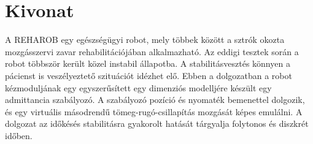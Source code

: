 \cleardoublepage{}
\chapter*{Kivonat}

A REHAROB egy egészségügyi robot, mely többek között a sztrók okozta mozgásszervi 
zavar rehabilitációjában alkalmazható. Az eddigi tesztek során a robot többször került 
közel instabil állapotba. A stabilitásvesztés könnyen a pácienst is veszélyeztető szituációt 
idézhet elő. Ebben a dolgozatban a robot 
kézmoduljának egy egyszerűsített egy dimenziós modelljére készült egy admittancia szabályozó. 
A szabályozó pozíció és nyomaték bemenettel 
dolgozik, és egy virtuális másodrendű tömeg-rugó-csillapítás mozgását képes emulálni. 
A dolgozat az időkésés stabilitásra gyakorolt hatását tárgyalja 
folytonos és diszkrét időben. 